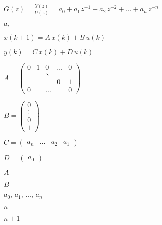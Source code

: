 \documentclass{article}
\begin{document}
$G(z) = \frac{Y(z)}{U(z)} = a_0 + a_1\,z^{-1} + a_2\,z^{-2} + \ldots + a_n\,z^{-n} $
\pagebreak

$a_i$
\pagebreak

$x(k+1) = A\,x(k) + B\,u(k)$
\pagebreak

$ y(k) = C\,x(k) + D\,u(k) $
\pagebreak

$A = \begin{pmatrix} 0 & 1 & 0 & \ldots & 0 \\ & & \ddots & & \\ & & & 0 & 1 \\ 0 & & \ldots & & 0 \end{pmatrix} $
\pagebreak

$B = \begin{pmatrix} 0 \\ \vdots \\ 0 \\ 1 \end{pmatrix} $
\pagebreak

$C = \begin{pmatrix} a_n & \ldots & a_2 & a_1 \end{pmatrix} $
\pagebreak

$D = \begin{pmatrix} a_0 \end{pmatrix} $
\pagebreak

$A$
\pagebreak

$B$
\pagebreak

$a_0,\,a_1,\,\ldots,\,a_n$
\pagebreak

$n$
\pagebreak

$n+1$
\pagebreak
\end{document}
